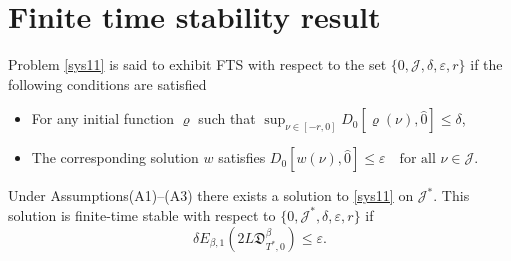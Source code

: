 \documentclass[reqno]{amsart}
\begin{document}
\section{Finite time stability result}

\begin{definition} \rm
Problem \eqref{sys11} is said to exhibit FTS with respect to the set 
$\{0,\mathcal{J},\delta,\varepsilon, r\}$ if the following conditions are 
satisfied
\begin{itemize}
 \item[(1)] For any initial function $\varrho$ such that
 $\sup_{\nu \in [- r,0]} D_0[\varrho(\nu ), \hat{0}] \leq \delta$,

\item[(2)] The corresponding solution $ w$ satisfies
 $D_0[ w(\nu ), \hat{0}] \leq \varepsilon \quad \text{for all } \nu \in \mathcal{J}$.
\end{itemize}
\end{definition}

\begin{theorem}\label{theo33}
Under Assumptions{\rm (A1)--(A3)} there exists a solution to \eqref{sys11} 
on \( \mathcal{J}^{*} \). This solution is finite-time stable with respect to 
\( \{0, \mathcal{J}^{*}, \delta, \varepsilon, r\} \) if 
\begin{equation}\label{ineq315}
\delta E_{\beta, 1}(2 L\mathfrak{D}_{T^{*},0}^{\beta}) \leq \varepsilon .
\end{equation}
\end{theorem}
\end{document}
